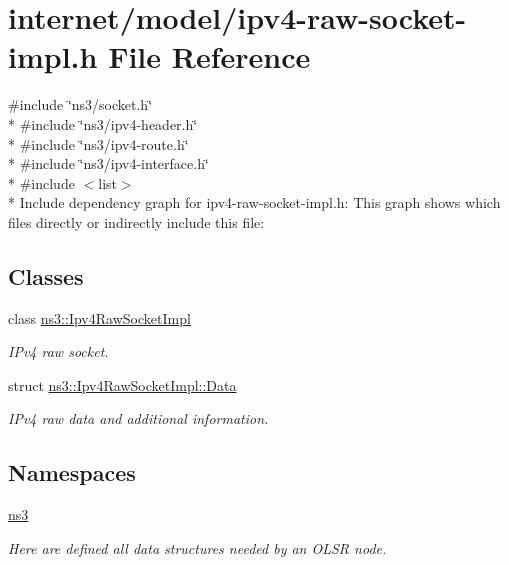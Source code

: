\hypertarget{ipv4-raw-socket-impl_8h}{}\section{internet/model/ipv4-\/raw-\/socket-\/impl.h File Reference}
\label{ipv4-raw-socket-impl_8h}
{\ttfamily \#include \char`\"{}ns3/socket.\+h\char`\"{}}\\*
{\ttfamily \#include \char`\"{}ns3/ipv4-\/header.\+h\char`\"{}}\\*
{\ttfamily \#include \char`\"{}ns3/ipv4-\/route.\+h\char`\"{}}\\*
{\ttfamily \#include \char`\"{}ns3/ipv4-\/interface.\+h\char`\"{}}\\*
{\ttfamily \#include $<$list$>$}\\*
Include dependency graph for ipv4-\/raw-\/socket-\/impl.h\+:
This graph shows which files directly or indirectly include this file\+:
\subsection*{Classes}
\begin{DoxyCompactItemize}
\item 
class \hyperlink{classns3_1_1Ipv4RawSocketImpl}{ns3\+::\+Ipv4\+Raw\+Socket\+Impl}
\begin{DoxyCompactList}\small\item\em I\+Pv4 raw socket. \end{DoxyCompactList}\item 
struct \hyperlink{structns3_1_1Ipv4RawSocketImpl_1_1Data}{ns3\+::\+Ipv4\+Raw\+Socket\+Impl\+::\+Data}
\begin{DoxyCompactList}\small\item\em I\+Pv4 raw data and additional information. \end{DoxyCompactList}\end{DoxyCompactItemize}
\subsection*{Namespaces}
\begin{DoxyCompactItemize}
\item 
 \hyperlink{namespacens3}{ns3}
\begin{DoxyCompactList}\small\item\em Here are defined all data structures needed by an O\+L\+SR node. \end{DoxyCompactList}\end{DoxyCompactItemize}
